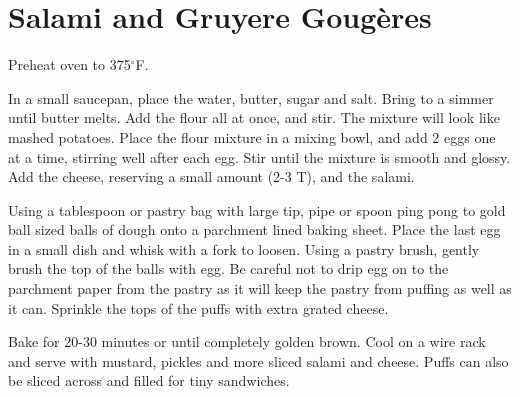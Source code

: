 \section{Salami and Gruyere Goug\`{e}res}
\begin{recipe}



	Preheat oven to 375$^{\circ}$F.

	In a small saucepan, place the water, butter, sugar and salt.  Bring to a simmer until butter melts.  Add the flour all at once, and stir.  The mixture will look like mashed potatoes.   Place the flour mixture in a mixing bowl, and add 2 eggs one at a time, stirring well after each egg.  Stir until the mixture is smooth and glossy.  Add the cheese, reserving a small amount (2-3 T), and the salami.

	Using a tablespoon or pastry bag with large tip, pipe or spoon ping pong to gold ball sized balls of dough onto a parchment lined baking sheet.  Place the last egg in a small dish and whisk with a fork to loosen.  Using a pastry brush, gently brush the top of the balls with egg.  Be careful not to drip egg on to the parchment paper from the pastry as it will keep the pastry from puffing as well as it can.  Sprinkle the tops of the puffs with extra grated cheese.

	Bake for 20-30 minutes or until completely golden brown. Cool on a wire rack and serve with mustard, pickles and more sliced salami and cheese.  Puffs can also be sliced across and filled for tiny sandwiches.

\end{recipe}
